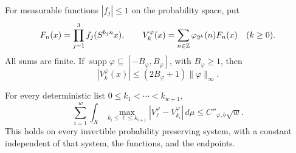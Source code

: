 For measurable functions \(|f_j|\leq1\) on the probability space,
put
\begin{equation}
 F_n(x)=\prod_{j=1}^3f_j(S^{b_jn}x),\qquad
 V_k^\varphi(x)=\sum_{n\in\mathbb Z}\varphi_{2^k}(n)F_n(x)
 \quad(k\geq0).
 \label{eq:tr-orbit-averages}
\end{equation}
All sums are finite.  If
\(\operatorname{supp}\varphi\subseteq[-B_\varphi,B_\varphi]\),
with \(B_\varphi\geq1\), then
\begin{equation}
 |V_k^\varphi(x)|\leq(2B_\varphi+1)\|\varphi\|_\infty.
 \label{eq:tr-uniform}
\end{equation}

\begin{proposition}
\label{prop:tr-oscillation}
For every deterministic list \(0\leq k_1<\cdots<k_{w+1}\),
\begin{equation}
 \sum_{i=1}^w\int_X
 \max_{k_i\leq\ell\leq k_{i+1}}
       |V_\ell^\varphi-V_{k_i}^\varphi|\,d\mu
 \leq C''_{\varphi,b}\sqrt w.
 \label{eq:tr-oscillation}
\end{equation}
This holds on every invertible probability preserving system, with a
constant independent of that system, the functions, and the endpoints.
\end{proposition}

